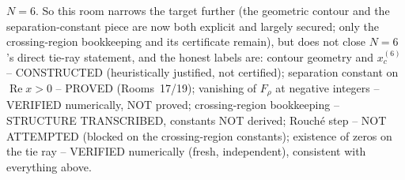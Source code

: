 \documentclass[11pt]{article}
\begin{document}
$N=6$. So this room narrows the target further (the geometric contour and the separation-constant piece
are now both explicit and largely secured; only the crossing-region bookkeeping and its certificate
remain), but does not close $N=6$'s direct tie-ray statement, and the honest labels are: contour geometry
and $x_c^{(6)}$ -- CONSTRUCTED (heuristically justified, not certified); separation constant on
$\operatorname{Re}x>0$ -- PROVED (Rooms~17/19); vanishing of $F_\rho$ at negative integers -- VERIFIED
numerically, NOT proved; crossing-region bookkeeping -- STRUCTURE TRANSCRIBED, constants NOT derived;
Rouch\'e step -- NOT ATTEMPTED (blocked on the crossing-region constants); existence of zeros on the
tie ray -- VERIFIED numerically (fresh, independent), consistent with everything above.
\end{document}
